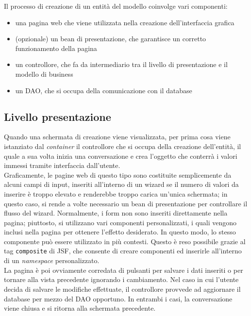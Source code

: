 
Il processo di creazione di un entità del modello coinvolge vari componenti:

\begin{itemize}
\item una pagina web che viene utilizzata nella creazione dell'interfaccia grafica
\item (opzionale) un bean di presentazione, che garantisce un corretto funzionamento della pagina
\item un controllore, che fa da intermediario tra il livello di presentazione e il modello di business
\item un DAO, che si occupa della comunicazione con il database
\end{itemize}

\subsection{Livello presentazione}

Quando una schermata di creazione viene visualizzata, per prima cosa viene istanziato dal \textit{container} il controllore che si occupa della creazione dell'entità, il quale a sua volta inizia una conversazione e crea l'oggetto che conterrà i valori immessi tramite interfaccia dall'utente.\\
Graficamente, le pagine web di questo tipo sono costituite semplicemente da alcuni campi di input, inseriti all'interno di un wizard se il numero di valori da inserire è troppo elevato e renderebbe troppo carica un'unica schermata; in questo caso, si rende a volte necessario un bean di presentazione per controllare il flusso del wizard. Normalmente, i form non sono inseriti direttamente nella pagina; piuttosto, si utilizzano vari componenti personalizzati, i quali vengono inclusi nella pagina per ottenere l'effetto desiderato. In questo modo, lo stesso componente può essere utilizzato in più contesti. Questo è reso possibile grazie al tag \lstinline{composite} di JSF, che consente di creare componenti ed inserirle all'interno di un \textit{namespace} personalizzato.\\
La pagina è poi ovviamente corredata di pulsanti per salvare i dati inseriti o per tornare alla vista precedente ignorando i cambiamento. Nel caso in cui l'utente decida di salvare le modifiche effettuate, il controllore provvede ad aggiornare il database per mezzo del DAO opportuno. In entrambi i casi, la conversazione viene chiusa e si ritorna alla schermata precedente.